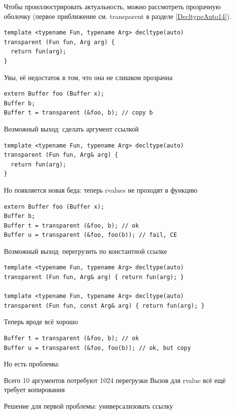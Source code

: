 \documentclass[a4paper,12pt,oneside]{article}
\begin{document}
Чтобы проиллюстрировать актуальность, можно рассмотреть прозрачную оболочку (первое приближение см. transparent в разделе \ref{DecltypeAuto14}).

\begin{lstlisting}
template <typename Fun, typename Arg> decltype(auto)
transparent (Fun fun, Arg arg) { 
  return fun(arg); 
}
\end{lstlisting}

Увы, её недостаток в том, что она не слишком прозрачна

\begin{lstlisting}
extern Buffer foo (Buffer x);
Buffer b;
Buffer t = transparent (&foo, b); // copy b
\end{lstlisting}

Возможный выход: сделать аргумент ссылкой

\begin{lstlisting}
template <typename Fun, typename Arg> decltype(auto)
transparent (Fun fun, Arg& arg) {
  return fun(arg); 
}
\end{lstlisting}

Но появляется новая беда: теперь rvalues не проходят в функцию

\begin{lstlisting}
extern Buffer foo (Buffer x);
Buffer b;
Buffer t = transparent (&foo, b); // ok
Buffer u = transparent (&foo, foo(b)); // fail, CE
\end{lstlisting}

Возможный выход: перегрузить по константной ссылке

\begin{lstlisting}
template <typename Fun, typename Arg> decltype(auto)
transparent (Fun fun, Arg& arg) { return fun(arg); }

template <typename Fun, typename Arg> decltype(auto)
transparent (Fun fun, const Arg& arg) { return fun(arg); }
\end{lstlisting}

Теперь вроде всё хорошо

\begin{lstlisting}
Buffer t = transparent (&foo, b); // ok
Buffer u = transparent (&foo, foo(b)); // ok, but copy
\end{lstlisting}

Но есть проблемы: 

Всего 10 аргументов потребуют 1024 перегрузки
Вызов для rvalue всё ещё требует копирования

Решение для первой проблемы: универсализовать ссылку
\end{document}
